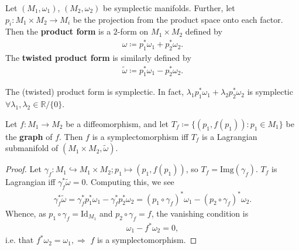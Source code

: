 \documentclass[11pt, final]{article}
\begin{document}
\begin{definition}
	Let $(M_1,\omega_1)$, $(M_2, \omega_2)$ be symplectic manifolds. Further, let $p_i: M_1 \times M_2 \to M_i$ be the projection from the product space onto each factor. Then the \textbf{product form} is a $2$-form on $M_1 \times M_2$ defined by
		\begin{align}
			\omega \coloneqq p_1^* \omega_1 + p_2^* \omega_2.
		\end{align}
	The \textbf{twisted product form} is similarly defined by
		\begin{align}
			\tilde{\omega} \coloneqq p_1^* \omega_1 - p_2^* \omega_2.
		\end{align}
\end{definition}
\begin{remark}
	The (twisted) product form is symplectic. In fact, $\lambda_1 p_1^* \omega_1 + \lambda_2 p_2^* \omega_2$ is symplectic $\forall \lambda_1, \lambda_2 \in \mathbb{R}/\{0\}$.
\end{remark}

\begin{prop}
	Let $f: M_1 \to M_2$ be a diffeomorphism, and let ${T_f \coloneqq \{ (p_1,f(p_1)) : p_1 \in M_1 \} }$ be the \textbf{graph} of $f$. Then $f$ is a symplectomorphism iff $T_f$ is a Lagrangian submanifold of $(M_1 \times M_2, \tilde{\omega})$.
\end{prop}
\begin{proof}
	Let $\gamma_f: M_1 \hookrightarrow M_1 \times M_2; p_1 \mapsto (p_1, f(p_1))$, so $T_f = \mathrm{Img} ( \gamma_f )$. $T_f$ is Lagrangian iff $\gamma^*_f \tilde{\omega} = 0$. Computing this, we see
		\begin{align}
			\gamma^*_f \tilde{\omega} = \gamma^*_f p^*_1 \omega_1 - \gamma^*_f p^*_2 \omega_2 = (p_1 \circ \gamma_f)^* \omega_1 - (p_2 \circ \gamma_f)^* \omega_2.
		\end{align}
	Whence, as $p_1 \circ \gamma_f = \mathrm{Id}_{M_1}$ and $p_2 \circ \gamma_f  = f$, the vanishing condition is
		\begin{align}
			\omega_1 - f^* \omega_2 = 0,
		\end{align}
	i.e. that $f^*\omega_2 = \omega_1, \Rightarrow$ $f$ is a symplectomorphism.
\end{proof}
\end{document}
